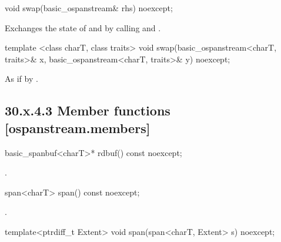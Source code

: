 \documentclass[ebook,11pt,article]{memoir}
\begin{document}
\begin{itemdecl}
void swap(basic_ospanstream& rhs) noexcept;
\end{itemdecl}

\begin{itemdescr}
\pnum
\effects Exchanges the state of  and
 by calling
 and
.
\end{itemdescr}


\begin{itemdecl}
template <class charT, class traits>
  void swap(basic_ospanstream<charT, traits>& x,
            basic_ospanstream<charT, traits>& y) noexcept;
\end{itemdecl}

\begin{itemdescr}
\pnum
\effects As if by .
\end{itemdescr}

\subsection{30.x.4.3 Member functions [ospanstream.members]}
\label{ospanstream.members}

\begin{itemdecl}
basic_spanbuf<charT>* rdbuf() const noexcept;
\end{itemdecl}

\begin{itemdescr}
\pnum
\returns
{}.
\end{itemdescr}

\begin{itemdecl}
span<charT> span() const noexcept;
\end{itemdecl}

\begin{itemdescr}
\pnum
\returns
{}.
\end{itemdescr}

\begin{itemdecl}
template<ptrdiff_t Extent>
void span(span<charT, Extent> s) noexcept;
\end{itemdecl}
\end{document}
